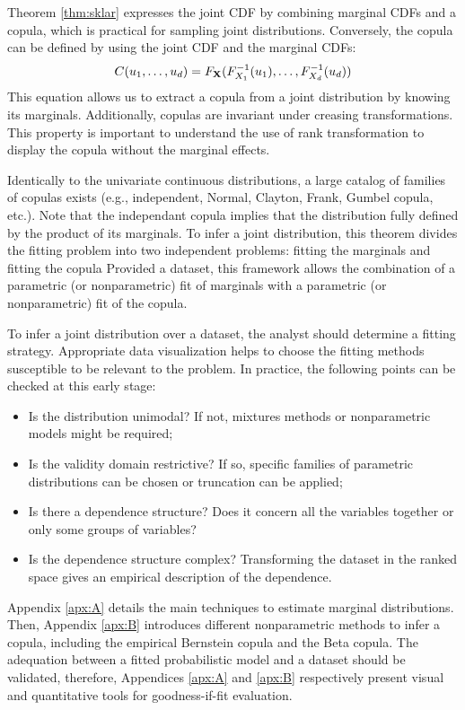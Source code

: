 Theorem \ref{thm:sklar} expresses the joint CDF by combining marginal CDFs and a copula, which is practical for sampling joint distributions. 
Conversely, the copula can be defined by using the joint CDF and the marginal CDFs: 
\begin{equation}
    C(u_1, \dots, u_d) = F_{{\bf X}}(F^{-1}_{X_1}(u_1), \dots, F^{-1}_{X_d}(u_d))
\end{equation}
This equation allows us to extract a copula from a joint distribution by knowing its marginals.
Additionally, copulas are invariant under creasing transformations. 
This property is important to understand the use of rank transformation to display the copula without the marginal effects.     

Identically to the univariate continuous distributions, a large catalog of families of copulas exists (e.g., independent, Normal, Clayton, Frank, Gumbel copula, etc.).
Note that the independant copula implies that the distribution fully defined by the product of its marginals.
To infer a joint distribution, this theorem divides the fitting problem into two independent problems: fitting the marginals and fitting the copula
Provided a dataset, this framework allows the combination of a parametric (or nonparametric) fit of marginals with a parametric (or nonparametric) fit of the copula. 

To infer a joint distribution over a dataset, the analyst should determine a fitting strategy.
Appropriate data visualization helps to choose the fitting methods susceptible to be relevant to the problem. 
In practice, the following points can be checked at this early stage:
\begin{itemize}
    \item Is the distribution unimodal? If not, mixtures methods or nonparametric models might be required;
    \item Is the validity domain restrictive? If so, specific families of parametric distributions can be chosen or truncation can be applied;
    \item Is there a dependence structure? Does it concern all the variables together or only some groups of variables? 
    \item Is the dependence structure complex? Transforming the dataset in the ranked space gives an empirical description of the dependence. 
\end{itemize} 

Appendix \ref{apx:A} details the main techniques to estimate marginal distributions. 
Then, Appendix \ref{apx:B} introduces different nonparametric methods to infer a copula, including the empirical Bernstein copula and the Beta copula. 
The adequation between a fitted probabilistic model and a dataset should be validated, therefore, Appendices \ref{apx:A} and \ref{apx:B} respectively present visual and quantitative tools for goodness-if-fit evaluation.


